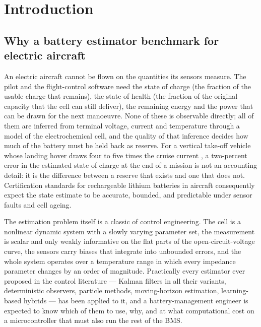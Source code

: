 \chapter{Introduction}
\label{ch:intro}

\section{Why a battery estimator benchmark for electric aircraft}

An electric aircraft cannot be flown on the quantities its sensors measure. The pilot and
the flight-control software need the state of charge (the fraction of the usable charge
that remains), the state of health (the fraction of the original capacity that the cell can
still deliver), the remaining energy and the power that can be drawn for the next
manoeuvre. None of these is observable directly; all of them are inferred from terminal
voltage, current and temperature through a model of the electrochemical cell, and the
quality of that inference decides how much of the battery must be held back as reserve.
For a vertical take-off vehicle whose landing hover draws four to five times the cruise
current \citep{yang2021evtol,fredericks2018vtol}, a two-percent error in the estimated state
of charge at the end of a mission is not an accounting detail: it is the difference between
a reserve that exists and one that does not. Certification standards for rechargeable
lithium batteries in aircraft \citep{rtca2017do311a} consequently expect the state estimate
to be accurate, bounded, and predictable under sensor faults and cell ageing.

The estimation problem itself is a classic of control engineering. The cell is a nonlinear
dynamic system with a slowly varying parameter set, the measurement is scalar and only
weakly informative on the flat parts of the open-circuit-voltage curve, the sensors carry
biases that integrate into unbounded errors, and the whole system operates over a
temperature range in which every impedance parameter changes by an order of magnitude.
Practically every estimator ever proposed in the control literature --- Kalman filters in
all their variants, deterministic observers, particle methods, moving-horizon estimation,
learning-based hybrids --- has been applied to it, and a battery-management engineer is
expected to know which of them to use, why, and at what computational cost on a
microcontroller that must also run the rest of the BMS.

